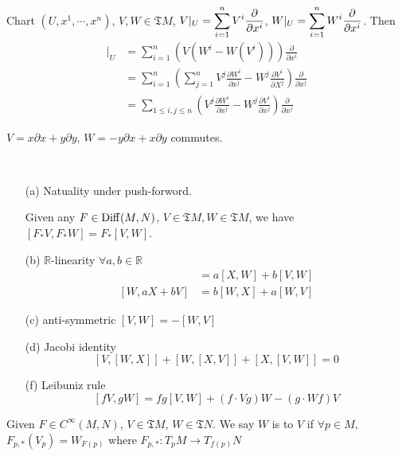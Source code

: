 \begin{proposition}
    Chart  $ (U,x^1,\cdots,x^n) $,  $ V,W\in \mathfrak{T}M $,  $ V|_U=\displaystyle\sum_{i=1}^n V^i\frac{\partial }{\partial  x^i} $,  $ W|_U=\displaystyle\sum_{i=1}^nW^i\frac{\partial}{\partial x^i} $. Then 
    \begin{align*}
        [V,W]|_U&=\sum_{i=1}^n(V(W^i-W(V^i)))\frac{\partial}{\partial x^i}\\
        &=\sum_{i=1}^n(\sum_{j=1}^nV^j\frac{\partial W^i}{\partial x^j}-W^j\frac{\partial V^i}{\partial X^j})\frac{\partial }{\partial x^j}\\
        &=\sum_{1 \leq i,j \leq n}(V^j\frac{\partial W^i}{\partial x^j}-W^j\frac{\partial V^i}{\partial x^j})\frac{\partial}{\partial x^j}
    \end{align*}
\end{proposition}
\begin{example}
     $ V=x\partial x+y\partial y $,  $ W=-y\partial x+x\partial y $ commutes.  
\end{example}
\begin{proposition}\label{properties of Lie bracket}
    \,
    \begin{enumerate}
        \item[(a)] Natuality under push-forword.
        
        Given any  $ F\in \mathrm{Diff}(M,N) $,  $ V\in \mathfrak{T}M, W\in \mathfrak{T}M  $, we have  $ [F_*V,F_*W]=F_*[V,W] $.
        \item[(b)]  $ \mathbb{R} $-linearity  $ \forall a,b\in \mathbb{R} $
        \begin{align*}
            [aX+bV,W]&=a[X,W]+b[V,W]\\
            [W,aX+bV]&=b[W,X]+a[W,V]
        \end{align*}  
        
        \item[(c)] anti-symmetric  $ [V,W]=-[W,V] $
        \item[(d)] Jacobi identity 
        \[[V,[W,X]]+[W,[X,V]]+[X,[V,W]]=0\]     
        \item[(f)] Leibuniz rule 
        \[[fV,gW]=fg[V,W]+(f\cdot Vg)W-(g\cdot Wf)V\]
    \end{enumerate}
\end{proposition}
\begin{definition}
    Given  $ F\in C^\infty(M,N) $,  $ V\in \mathfrak{T}M $,  $ W\in \mathfrak{T}N $. We say  $ W $ is   to  $ V $ if  $ \forall p\in M $,  $ F_{p,*}(V_p)=W_{F(p)} $ where $  F_{p,*}:T_pM\rightarrow T_{f(p)}N $      
\end{definition}

